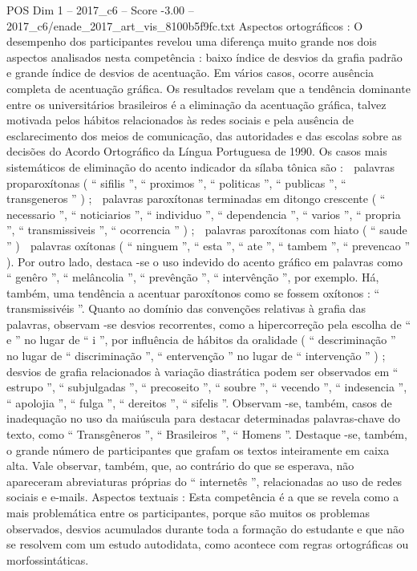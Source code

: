 \begin{textsample}{POS Dim 1 – 2017\_c6 – Score -3.00 – 2017\_c6/enade\_2017\_art\_vis\_8100b5f9fc.txt}
Aspectos ortográficos : O desempenho dos participantes revelou uma diferença muito grande nos dois aspectos analisados nesta competência : baixo índice de desvios da grafia padrão e grande índice de desvios de acentuação.
Em vários casos, ocorre ausência completa de acentuação gráfica.
Os resultados revelam que a tendência dominante entre os universitários brasileiros é a eliminação da acentuação gráfica, talvez motivada pelos hábitos relacionados às redes sociais e pela ausência de esclarecimento dos meios de comunicação, das autoridades e das escolas sobre as decisões do Acordo Ortográfico da Língua Portuguesa de 1990.
Os casos mais sistemáticos de eliminação do acento indicador da sílaba tônica são :  palavras proparoxítonas ( “ sifilis ”, “ proximos ”, “ politicas ”, “ publicas ”, “ transgeneros ” ) ;  palavras paroxítonas terminadas em ditongo crescente ( “ necessario ”, “ noticiarios ”, “ individuo ”, “ dependencia ”, “ varios ”, “ propria ”, “ transmissiveis ”, “ ocorrencia ” ) ;  palavras paroxítonas com hiato ( “ saude ” )  palavras oxítonas ( “ ninguem ”, “ esta ”, “ ate ”, “ tambem ”, “ prevencao ” ).
Por outro lado, destaca -se o uso indevido do acento gráfico em palavras como “ genêro ”, “ melâncolia ”, “ prevênção ”, “ intervênção ”, por exemplo.
Há, também, uma tendência a acentuar paroxítonos como se fossem oxítonos : “ transmissivéis ”.
Quanto ao domínio das convenções relativas à grafia das palavras, observam -se desvios recorrentes, como a hipercorreção pela escolha de “ e ” no lugar de “ i ”, por influência de hábitos da oralidade ( “ descriminação ” no lugar de “ discriminação ”, “ entervenção ” no lugar de “ intervenção ” ) ; desvios de grafia relacionados à variação diastrática podem ser observados em “ estrupo ”, “ subjulgadas ”, “ precoseito ”, “ soubre ”, “ vecendo ”, “ indesencia ”, “ apolojia ”, “ fulga ”, “ dereitos ”, “ sifelis ”.
Observam -se, também, casos de inadequação no uso da maiúscula para destacar determinadas palavras-chave do texto, como “ Transgêneros ”, “ Brasileiros ”, “ Homens ”.
Destaque -se, também, o grande número de participantes que grafam os textos inteiramente em caixa alta.
Vale observar, também, que, ao contrário do que se esperava, não apareceram abreviaturas próprias do “ internetês ”, relacionadas ao uso de redes sociais e e-mails.
Aspectos textuais : Esta competência é a que se revela como a mais problemática entre os participantes, porque são muitos os problemas observados, desvios acumulados durante toda a formação do estudante e que não se resolvem com um estudo autodidata, como acontece com regras ortográficas ou morfossintáticas.

\end{textsample}

